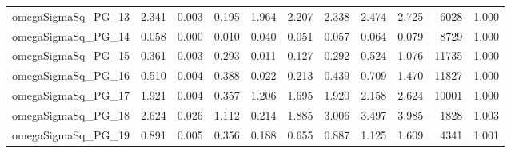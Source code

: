 \documentclass[12pt]{article}
\begin{document}
\begin{longtable}{lrrrrrrrrrr}
omegaSigmaSq\_PG\_13 & 2.341 & 0.003 & 0.195 & 1.964 & 2.207 & 2.338 & 2.474 & 2.725 & 6028 & 1.000 \\
omegaSigmaSq\_PG\_14 & 0.058 & 0.000 & 0.010 & 0.040 & 0.051 & 0.057 & 0.064 & 0.079 & 8729 & 1.000 \\
omegaSigmaSq\_PG\_15 & 0.361 & 0.003 & 0.293 & 0.011 & 0.127 & 0.292 & 0.524 & 1.076 & 11735 & 1.000 \\
omegaSigmaSq\_PG\_16 & 0.510 & 0.004 & 0.388 & 0.022 & 0.213 & 0.439 & 0.709 & 1.470 & 11827 & 1.000 \\
omegaSigmaSq\_PG\_17 & 1.921 & 0.004 & 0.357 & 1.206 & 1.695 & 1.920 & 2.158 & 2.624 & 10001 & 1.000 \\
omegaSigmaSq\_PG\_18 & 2.624 & 0.026 & 1.112 & 0.214 & 1.885 & 3.006 & 3.497 & 3.985 & 1828 & 1.003 \\
omegaSigmaSq\_PG\_19 & 0.891 & 0.005 & 0.356 & 0.188 & 0.655 & 0.887 & 1.125 & 1.609 & 4341 & 1.001 \\
\end{longtable}
\endgroup


\newpage
\end{document}
